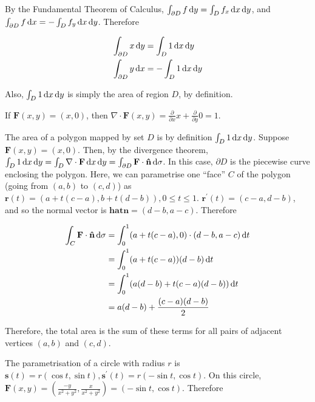 
By the Fundamental Theorem of Calculus, $\int_{\partial D} f \mathop{}\!\mathrm{d} y = \int_D f_x \mathop{}\!\mathrm{d} x \mathop{}\!\mathrm{d} y$, and $\int_{\partial D} f \mathop{}\!\mathrm{d} x = -\int_D f_y \mathop{}\!\mathrm{d} x \mathop{}\!\mathrm{d} y$. Therefore

\begin{align*}
  \int_{\partial D} x \mathop{}\!\mathrm{d} y &= \int_D 1 \mathop{}\!\mathrm{d} x \mathop{}\!\mathrm{d} y \\
  \int_{\partial D} y \mathop{}\!\mathrm{d} x &= -\int_D 1 \mathop{}\!\mathrm{d} x \mathop{}\!\mathrm{d} y
\end{align*}

Also, $\int_D 1 \mathop{}\!\mathrm{d} x \mathop{}\!\mathrm{d} y$ is simply the area of region $D$, by definition.

If $\mathbf{F}(x, y) = (x, 0)$, then $\nabla \cdot \mathbf{F}(x, y) = \frac{\partial}{\partial x} x + \frac{\partial}{\partial y} 0 = 1$.

The area of a polygon mapped by set $D$ is by definition $\int_D 1 \mathop{}\!\mathrm{d} x \mathop{}\!\mathrm{d} y$. Suppose $\mathbf{F}(x, y) = (x, 0)$. Then, by the divergence theorem, $\int_D 1 \mathop{}\!\mathrm{d} x \mathop{}\!\mathrm{d} y = \int_D \nabla \cdot \mathbf{F} \mathop{}\!\mathrm{d} x \mathop{}\!\mathrm{d} y = \int_{\partial D} \mathbf{F} \cdot \mathbf{\hat{n}} \mathop{}\!\mathrm{d} \sigma$. In this case, $\partial D$ is the piecewise curve enclosing the polygon. Here, we can parametrise one ``face'' $C$ of the polygon (going from $(a, b)$ to $(c, d)$) as $\mathbf{r}(t) = (a + t(c - a), b + t(d - b)), 0 \leq t \leq 1$. $\mathbf{r}^{\prime}(t) = (c - a, d - b)$, and so the normal vector is $\mathbf{hat{n}} = (d - b, a - c)$. Therefore

\begin{align*}
  \int_C \mathbf{F} \cdot \mathbf{\hat{n}} \mathop{}\!\mathrm{d} \sigma &= \int_0^1 (a + t(c - a), 0) \cdot (d - b, a - c) \mathop{}\!\mathrm{d} t \\
  &= \int_0^1 (a + t(c - a))(d - b) \mathop{}\!\mathrm{d} t \\
  &= \int_0^1 (a(d - b) + t(c - a)(d - b)) \mathop{}\!\mathrm{d} t \\
  &= a(d - b) + \frac{(c - a)(d - b)}{2}
\end{align*}

Therefore, the total area is the sum of these terms for all pairs of adjacent vertices $(a, b)$ and $(c, d)$.


The parametrisation of a circle with radius $r$ is $\mathbf{s}(t) = r(\cos t, \sin t), \mathbf{s}^{\prime}(t) = r(-\sin t, \cos t)$. On this circle, $\mathbf{F}(x, y) = \left(\frac{-y}{x^2 + y^2}, \frac{x}{x^2 + y^2}\right) = (-\sin t, \cos t)$. Therefore

